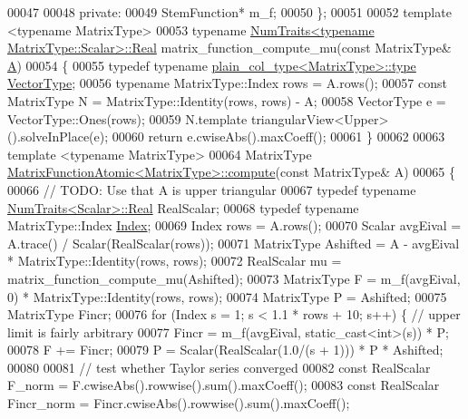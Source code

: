 \begin{DoxyCode}
00047 
00048   \textcolor{keyword}{private}:
00049     StemFunction* m\_f;
00050 \};
00051 
00052 \textcolor{keyword}{template} <\textcolor{keyword}{typename} MatrixType>
00053 \textcolor{keyword}{typename} \hyperlink{group___core___module_struct_eigen_1_1_num_traits}{NumTraits<typename MatrixType::Scalar>::Real} 
      matrix\_function\_compute\_mu(\textcolor{keyword}{const} MatrixType& \hyperlink{group___core___module_class_eigen_1_1_matrix}{A})
00054 \{
00055   \textcolor{keyword}{typedef} \textcolor{keyword}{typename} \hyperlink{struct_eigen_1_1internal_1_1plain__col__type}{plain\_col\_type<MatrixType>::type} 
      \hyperlink{struct_vector_type}{VectorType};
00056   \textcolor{keyword}{typename} MatrixType::Index rows = A.rows();
00057   \textcolor{keyword}{const} MatrixType N = MatrixType::Identity(rows, rows) - A;
00058   VectorType e = VectorType::Ones(rows);
00059   N.template triangularView<Upper>().solveInPlace(e);
00060   \textcolor{keywordflow}{return} e.cwiseAbs().maxCoeff();
00061 \}
00062 
00063 \textcolor{keyword}{template} <\textcolor{keyword}{typename} MatrixType>
00064 MatrixType \hyperlink{class_eigen_1_1internal_1_1_matrix_function_atomic_a704ccdc87d66cb6f93d16e0a0b9e8acf}{MatrixFunctionAtomic<MatrixType>::compute}(\textcolor{keyword}{const} 
      MatrixType& A)
00065 \{
00066   \textcolor{comment}{// TODO: Use that A is upper triangular}
00067   \textcolor{keyword}{typedef} \textcolor{keyword}{typename} \hyperlink{group___core___module_struct_eigen_1_1_num_traits}{NumTraits<Scalar>::Real} RealScalar;
00068   \textcolor{keyword}{typedef} \textcolor{keyword}{typename} MatrixType::Index \hyperlink{namespace_eigen_a62e77e0933482dafde8fe197d9a2cfde}{Index};
00069   Index rows = A.rows();
00070   Scalar avgEival = A.trace() / Scalar(RealScalar(rows));
00071   MatrixType Ashifted = A - avgEival * MatrixType::Identity(rows, rows);
00072   RealScalar mu = matrix\_function\_compute\_mu(Ashifted);
00073   MatrixType F = m\_f(avgEival, 0) * MatrixType::Identity(rows, rows);
00074   MatrixType P = Ashifted;
00075   MatrixType Fincr;
00076   \textcolor{keywordflow}{for} (Index s = 1; s < 1.1 * rows + 10; s++) \{ \textcolor{comment}{// upper limit is fairly arbitrary}
00077     Fincr = m\_f(avgEival, static\_cast<int>(s)) * P;
00078     F += Fincr;
00079     P = Scalar(RealScalar(1.0/(s + 1))) * P * Ashifted;
00080 
00081     \textcolor{comment}{// test whether Taylor series converged}
00082     \textcolor{keyword}{const} RealScalar F\_norm = F.cwiseAbs().rowwise().sum().maxCoeff();
00083     \textcolor{keyword}{const} RealScalar Fincr\_norm = Fincr.cwiseAbs().rowwise().sum().maxCoeff();

\end{DoxyCode}
